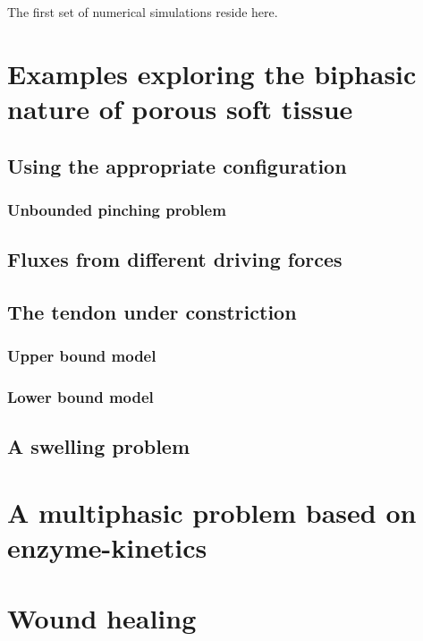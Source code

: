 The first set of numerical simulations reside here.

\section{Examples exploring the biphasic nature of porous soft tissue}
\label{biphasic-examples-1}

\subsection{Using the appropriate configuration}
\label{biphasic-examples-1}

\subsubsection{Unbounded pinching problem}
\label{unbounded-pinching}

\subsection{Fluxes from different driving forces}
\label{flux-driving-forces}

\subsection{The tendon under constriction}
\label{constriction-1}

\subsubsection{Upper bound model}
\label{upper-bound}

\subsubsection{Lower bound model}
\label{lower-bound}

\subsection{A swelling problem}
\label{swelling-1}

\section{A multiphasic problem based on enzyme-kinetics}
\label{enzyme-kinetics}

\section{Wound healing}
\label{wound-healing}
